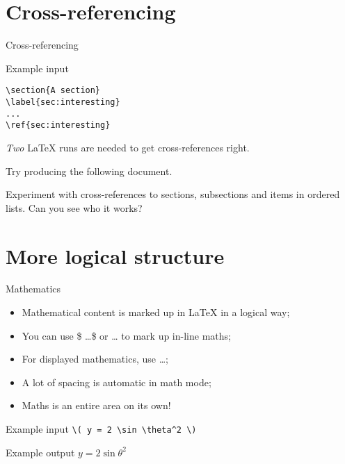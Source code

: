 \section{Cross-referencing}

\begin{frame}[fragile]{Cross-referencing}

  \begin{block}{Example input}
    \begin{verbatim}
\section{A section}
\label{sec:interesting}
...
\ref{sec:interesting}
    \end{verbatim}
  \end{block}
  
  \emph{Two} \LaTeX{} runs are needed to get cross-references right.

\end{frame}


\begin{exercise}
  Try producing the following document.
  
  
  Experiment with cross-references to sections, subsections and items in
  ordered lists. Can you see who it works?
\end{exercise}


\section{More logical structure}

\begin{frame}[fragile]{Mathematics}

  \begin{itemize}
    \item Mathematical content is marked up in \LaTeX{} in a logical way;
    \item You can use \$ \ldots \$ or \cs{(} \ldots \cs{)} to mark up
      in-line maths;
    \item For displayed mathematics, use \cs{[} \ldots \cs{]};
    \item A lot of spacing is automatic in math mode;
    \item Maths is an entire area on its own!
  \end{itemize}
  
  \begin{block}{Example input}
    \verb"\( y = 2 \sin \theta^2 \)" 
  \end{block}
  
  \begin{block}{Example output}
    \( y = 2 \sin \theta^2 \)
  \end{block}

\end{frame}

